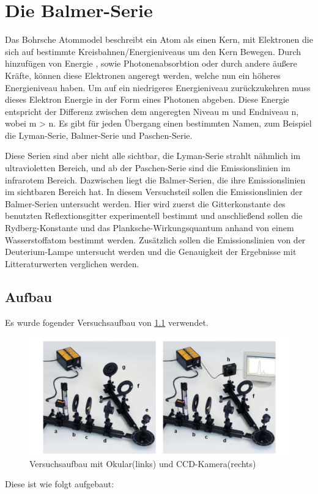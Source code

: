 \chapter{Die Balmer-Serie}

Das Bohrsche Atommodel beschreibt ein Atom als einen Kern, mit Elektronen die sich auf bestimmte Kreisbahnen/Energieniveaus um den Kern Bewegen.
Durch hinzufügen von Energie , sowie Photonenabsorbtion oder durch andere äußere Kräfte, können diese Elektronen angeregt werden, welche nun ein höheres Energieniveau haben. 
Um auf ein niedrigeres Energieniveau zurückzukehren muss dieses Elektron Energie in der Form eines Photonen abgeben. 
Diese Energie entspricht der Differenz zwischen dem angeregten Niveau m und Endniveau n, wobei m > n. 
Es gibt für jeden Übergang einen bestimmten Namen, zum Beispiel die Lyman-Serie, Balmer-Serie und Paschen-Serie.


Diese Serien sind aber nicht alle sichtbar, die Lyman-Serie strahlt nähmlich im ultravioletten Bereich, und ab der Paschen-Serie sind die Emissionslinien im infrarotem Bereich.
Dazwischen liegt die Balmer-Serien, die ihre Emissionslinien im sichtbaren Bereich hat.
In diesem Versuchsteil sollen die Emissionslinien der Balmer-Serien untersucht werden. 
Hier wird zuerst die Gitterkonstante des benutzten Reflextionsgitter experimentell bestimmt und anschließend sollen die Rydberg-Konstante und das Planksche-Wirkungsquantum anhand von einem Wasserstoffatom bestimmt werden.
Zusätzlich sollen die Emissionslinien von der Deuterium-Lampe untersucht werden und die Genauigkeit der Ergebnisse mit Litteraturwerten verglichen werden.


\section{Aufbau}

Es wurde fogender Versuchsaufbau von \cref{fig:balmeraufbau} verwendet. 

\begin{figure}[htbp]
    \centering
    \includegraphics[width=0.7\linewidth]{figs/aufbau_balmer_serie.png}
    \caption{Versuchsaufbau mit Okular(links) und CCD-Kamera(rechts) \cite{praktikum}}
    \label{fig:balmeraufbau}
\end{figure}
Diese ist wie folgt aufgebaut: 

